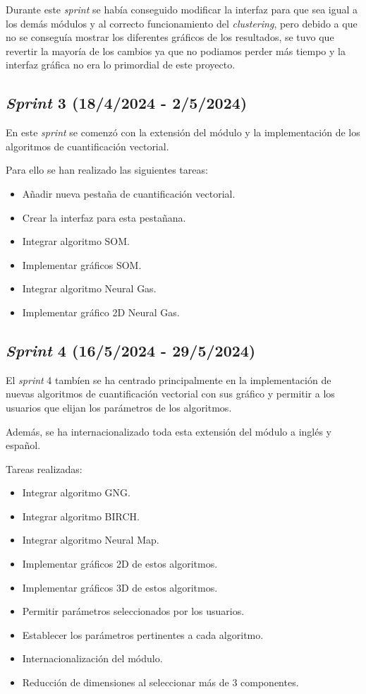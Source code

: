 Durante este \emph{sprint} se había conseguido modificar la interfaz para que sea igual a los demás módulos y al correcto funcionamiento del \emph{clustering}, pero debido a que no se conseguía mostrar los diferentes gráficos de los resultados, se tuvo que revertir la mayoría de los cambios ya que no podiamos perder más tiempo y la interfaz gráfica no era lo primordial de este proyecto.

\subsection{\emph{Sprint} 3 (18/4/2024 - 2/5/2024)}

En este \emph{sprint} se comenzó con la extensión del módulo y la implementación de los algoritmos de cuantificación vectorial.

Para ello se han realizado las siguientes tareas:

\begin{itemize}
    \item Añadir nueva pestaña de cuantificación vectorial.
    \item Crear la interfaz para esta pestañana.
    \item Integrar algoritmo SOM.
    \item Implementar gráficos SOM.
    \item Integrar algoritmo Neural Gas.
    \item Implementar gráfico 2D Neural Gas.
\end{itemize}

\subsection{\emph{Sprint} 4 (16/5/2024 - 29/5/2024)}

El \emph{sprint} 4 tambíen se ha centrado principalmente en la implementación de nuevas algoritmos de cuantificación vectorial con sus gráfico y permitir a los usuarios que elijan los parámetros de los algoritmos.

Además, se ha internacionalizado toda esta extensión del módulo a inglés y español.

Tareas realizadas:

\begin{itemize}
    \item Integrar algoritmo GNG.
    \item Integrar algoritmo BIRCH.
    \item Integrar algoritmo Neural Map.    
    \item Implementar gráficos 2D de estos algoritmos.
    \item Implementar gráficos 3D de estos algoritmos.
    \item Permitir parámetros seleccionados por los usuarios.
    \item Establecer los parámetros pertinentes a cada algoritmo.
    \item Internacionalización del módulo.
    \item Reducción de dimensiones al seleccionar más de 3 componentes.
\end{itemize}


